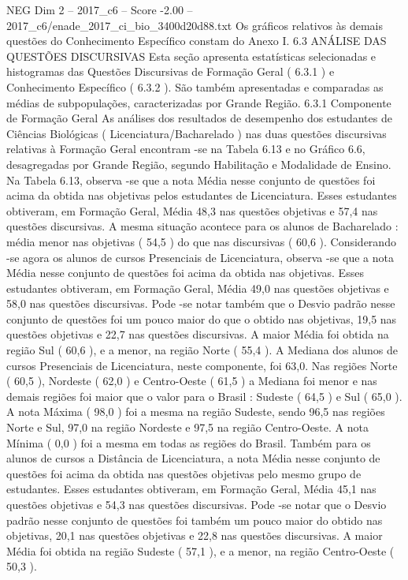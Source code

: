 \begin{textsample}{NEG Dim 2 – 2017\_c6 – Score -2.00 – 2017\_c6/enade\_2017\_ci\_bio\_3400d20d88.txt}
Os gráficos relativos às demais questões do Conhecimento Específico constam do Anexo I. 6.3 ANÁLISE DAS QUESTÕES DISCURSIVAS Esta seção apresenta estatísticas selecionadas e histogramas das Questões Discursivas de Formação Geral ( 6.3.1 ) e Conhecimento Específico ( 6.3.2 ).
São também apresentadas e comparadas as médias de subpopulações, caracterizadas por Grande Região. 6.3.1 Componente de Formação Geral As análises dos resultados de desempenho dos estudantes de Ciências Biológicas ( Licenciatura/Bacharelado ) nas duas questões discursivas relativas à Formação Geral encontram -se na Tabela 6.13 e no Gráfico 6.6, desagregadas por Grande Região, segundo Habilitação e Modalidade de Ensino.
Na Tabela 6.13, observa -se que a nota Média nesse conjunto de questões foi acima da obtida nas objetivas pelos estudantes de Licenciatura.
Esses estudantes obtiveram, em Formação Geral, Média 48,3 nas questões objetivas e 57,4 nas questões discursivas.
A mesma situação acontece para os alunos de Bacharelado : média menor nas objetivas ( 54,5 ) do que nas discursivas ( 60,6 ).
Considerando -se agora os alunos de cursos Presenciais de Licenciatura, observa -se que a nota Média nesse conjunto de questões foi acima da obtida nas objetivas.
Esses estudantes obtiveram, em Formação Geral, Média 49,0 nas questões objetivas e 58,0 nas questões discursivas.
Pode -se notar também que o Desvio padrão nesse conjunto de questões foi um pouco maior do que o obtido nas objetivas, 19,5 nas questões objetivas e 22,7 nas questões discursivas.
A maior Média foi obtida na região Sul ( 60,6 ), e a menor, na região Norte ( 55,4 ).
A Mediana dos alunos de cursos Presenciais de Licenciatura, neste componente, foi 63,0.
Nas regiões Norte ( 60,5 ), Nordeste ( 62,0 ) e Centro-Oeste ( 61,5 ) a Mediana foi menor e nas demais regiões foi maior que o valor para o Brasil : Sudeste ( 64,5 ) e Sul ( 65,0 ).
A nota Máxima ( 98,0 ) foi a mesma na região Sudeste, sendo 96,5 nas regiões Norte e Sul, 97,0 na região Nordeste e 97,5 na região Centro-Oeste.
A nota Mínima ( 0,0 ) foi a mesma em todas as regiões do Brasil.
Também para os alunos de cursos a Distância de Licenciatura, a nota Média nesse conjunto de questões foi acima da obtida nas questões objetivas pelo mesmo grupo de estudantes.
Esses estudantes obtiveram, em Formação Geral, Média 45,1 nas questões objetivas e 54,3 nas questões discursivas.
Pode -se notar que o Desvio padrão nesse conjunto de questões foi também um pouco maior do obtido nas objetivas, 20,1 nas questões objetivas e 22,8 nas questões discursivas.
A maior Média foi obtida na região Sudeste ( 57,1 ), e a menor, na região Centro-Oeste ( 50,3 ).

\end{textsample}
